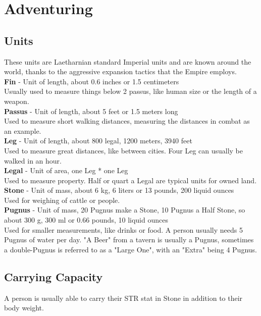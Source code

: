 \chapter{Adventuring}
\section{Units}
These units are Laetharnian standard Imperial units and are known around the world, thanks to the aggressive expansion tactics that the Empire employs.\\


\textbf{Fin} - Unit of length, about 0.6 inches or 1.5 centimeters\\
Usually used to measure things below 2 passus, like human size or the length of a weapon.\\


\textbf{Passus} - Unit of length, about 5 feet or 1.5 meters long\\
Used to measure short walking distances, measuring the distances in combat as an example.\\


\textbf{Leg} - Unit of length, about 800 legal, 1200 meters,  3940 feet\\
Used to measure great distances, like between cities. Four Leg can usually be walked in an hour.\\


\textbf{Legal} - Unit of area, one Leg * one Leg\\
Used to measure property. Half or quart a Legal are typical units for owned land.\\


\textbf{Stone} - Unit of mass, about 6 kg, 6 liters or 13 pounds, 200 liquid ounces\\
Used for weighing of cattle or people.\\


\textbf{Pugnus} - Unit of mass, 20 Pugnus make a Stone, 10 Pugnus a Half Stone, so about 300 g, 300 ml or 0.66 pounds, 10 liquid ounces\\
Used for smaller measurements, like drinks or food. A person usually needs 5 Pugnus of water per day. "A Beer" from a tavern is usually a Pugnus, sometimes a double-Pugnus is referred to as a  "Large One", with an "Extra" being 4 Pugnus.\\

\section{Carrying Capacity}
A person is usually able to carry their STR stat in Stone in addition to their body weight.\\



